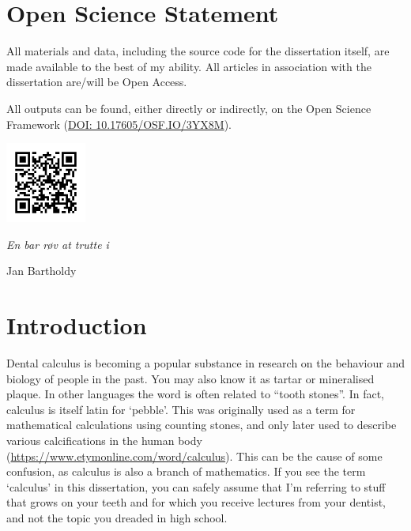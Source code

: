 \documentclass[
  b5paper,
]{book}
\begin{document}
\label{open-science-statement}

\chapter*{Open Science Statement}


All materials and data, including the source code for the dissertation
itself, are made available to the best of my ability. All articles in
association with the dissertation are/will be Open Access.

All outputs can be found, either directly or indirectly, on the Open
Science Framework (\href{https://doi.org/10.17605/OSF.IO/3YX8M}{DOI:
10.17605/OSF.IO/3YX8M}).

\includegraphics[width=1.04167in,height=\textheight]{figures/osf-qr.png}

\clearpage
\thispagestyle{empty}
\vspace*{3cm}

\hfill\textit{En bar røv at trutte i}

\par

\hfill\vspace*{4cm} Jan Bartholdy \vspace*{\fill}


\chapter{Introduction}\label{chap-intro}

Dental calculus is becoming a popular substance in research on the
behaviour and biology of people in the past. You may also know it as
tartar or mineralised plaque. In other languages the word is often
related to ``tooth stones''. In fact, calculus is itself latin for
`pebble'. This was originally used as a term for mathematical
calculations using counting stones, and only later used to describe
various calcifications in the human body
(\url{https://www.etymonline.com/word/calculus}). This can be the cause
of some confusion, as calculus is also a branch of mathematics. If you
see the term `calculus' in this dissertation, you can safely assume that
I'm referring to stuff that grows on your teeth and for which you
receive lectures from your dentist, and not the topic you dreaded in
high school.
\end{document}

